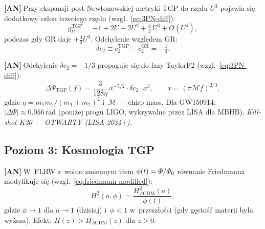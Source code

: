 \begin{chain}[A13 --- Poprawka 3PN: $\Delta c_2 = -1/3$]\label{chain:A13}
  \textbf{[AN]}$\;$Przy ekspansji post-Newtonowskiej metryki TGP
  do rz\k{e}du $U^3$ pojawia si\k{e} dodatkowy cz\l{}on trzeciego
  rz\k{e}du (wzgl.~\eqref{eq:3PN-diff}):
  \begin{equation}\label{eq:H-3PN}
    g_{tt}^{\mathrm{TGP}} = -1 + 2U - 2U^2 + \tfrac{4}{3}\,U^3 + O(U^4),
  \end{equation}
  podczas gdy GR daje $+\frac{4}{3}U^3$.
  Odchylenie wzgl\k{e}dem GR:
  \begin{equation}\label{eq:H-delta-c2}
    \delta c_2 \equiv c_2^{\mathrm{TGP}} - c_2^{\mathrm{GR}} = -\tfrac{1}{3}.
  \end{equation}
\end{chain}

\begin{chain}%
  \label{chain:A14}
  \textbf{[AN]}$\;$Odchylenie $\delta c_2 = -1/3$ propaguje si\k{e}
  do fazy TaylorF2 (wzgl.~\eqref{eq:3PN-diff}):
  \begin{equation}\label{eq:H-TaylorF2}
    \Delta\Psi_{\mathrm{TGP}}(f)
    = \frac{3}{128\eta}\,x^{-5/2}\cdot\delta c_2\cdot x^3,
    \qquad
    x = (\pi\mathcal{M}f)^{2/3},
  \end{equation}
  gdzie $\eta = m_1 m_2 / (m_1+m_2)^2$ i~$\mathcal{M}$ --- chirp mass.
  Dla GW150914: $|\Delta\Psi| \approx 0.056\,\mathrm{rad}$
  (poni\.zej progu LIGO, wykrywalne przez LISA dla MBHB).
  \emph{Kill-shot K20 --- OTWARTY (LISA 2034+).}
\end{chain}

\subsection{Poziom 3: Kosmologia TGP}%
\label{app:H-cosmo}

\begin{chain}\label{chain:A15}
  \textbf{[AN]}$\;$W~FLRW z~wolno zmiennym t\l{}em $\phi(t) = \varPhi/\varPhi_0$
  r\'ownanie Friedmanna modyfikuje si\k{e} (wzgl.~\eqref{eq:friedmann-modified}):
  \begin{equation}\label{eq:H-Friedmann}
    H^2(a,\phi) = \frac{H^2_{\Lambda\mathrm{CDM}}(a)}{\phi(t)},
  \end{equation}
  gdzie $\phi \to 1$ dla $a \to 1$ (dzisiaj) i~$\phi < 1$ w~przesz\l{}o\'sci
  (gdy g\k{e}sto\'s\'c materii by\l{}a wy\.zsza).
  Efekt: $H(z) > H_{\Lambda\mathrm{CDM}}(z)$ dla $z > 0$.
\end{chain}

